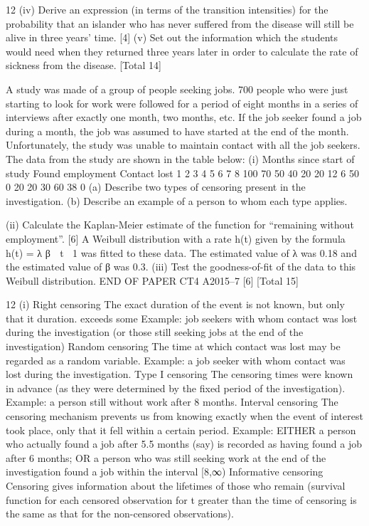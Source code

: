 \documentclass[a4paper,12pt]{article}
\begin{document}
\begin{enumerate}

12
(iv) Derive an expression (in terms of the transition intensities) for the probability
that an islander who has never suffered from the disease will still be alive in
three years’ time.
[4]
(v) Set out the information which the students would need when they returned three years later in order to calculate the rate of sickness from the disease. 
[Total 14]

A study was made of a group of people seeking jobs. 700 people who were just starting to look for work were followed for a period of eight months in a series of interviews after exactly one month, two months, etc. If the job seeker found a job during a month, the job was assumed to have started at the end of the month.
Unfortunately, the study was unable to maintain contact with all the job seekers. The data from the study are shown in the table below:
(i)
Months since
start of study Found employment Contact lost
1
2
3
4
5
6
7
8 100
70
50
40
20
20
12
6 50
0
20
20
30
60
38
0
(a) Describe two types of censoring present in the investigation.
(b) Describe an example of a person to whom each type applies.


(ii)
Calculate the Kaplan-Meier estimate of the function for “remaining without
employment”.
[6]
A Weibull distribution with a rate h(t) given by the formula h(t) = λ β  t 1 was fitted
to these data. The estimated value of λ was 0.18 and the estimated value of β was 0.3.
(iii)
Test the goodness-of-fit of the data to this Weibull distribution.
END OF PAPER
CT4 A2015–7
[6]
[Total 15]


12
(i)
Right censoring
The exact duration of the event is not known, but only that it duration.
exceeds some
Example: job seekers with whom contact was lost during the investigation (or those still seeking jobs at the end of the investigation)
Random censoring
The time at which contact was lost may be regarded as a random variable.
Example: a job seeker with whom contact was lost during the investigation.
Type I censoring
The censoring times were known in advance (as they were determined by the fixed period of the investigation).
Example: a person still without work after 8 months.
Interval censoring
The censoring mechanism prevents us from knowing exactly when the event of interest took place, only that it fell within a certain period.
Example: EITHER a person who actually found a job after 5.5 months (say) is recorded as having found a job after 6 months;
OR a person who was still seeking work at the end of the investigation found a job within the interval [8,∞)
Informative censoring
Censoring gives information about the lifetimes of those who remain (survival function for each censored observation for t greater than the time of censoring is the same as that for the non-censored observations).


\end{enumerate}
\end{document}

